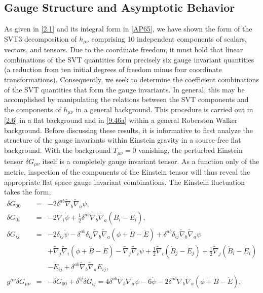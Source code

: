 \subsection{Gauge Structure and Asymptotic Behavior}
\label{ss:gauge_struct_svt3}
As given in \eqref{2.1} and its integral form in \eqref{AP65}, we have shown the form of the SVT3 decomposition of $h_{\mu\nu}$ comprising 10 independent components of scalars, vectors, and tensors. Due to the coordinate freedom, it must hold that linear combinations of the SVT quantities form precisely six gauge invariant quantities (a reduction from ten initial degrees of freedom minus four coordinate transformations). Consequently, we seek to determine the coefficient combinations of the SVT quantities that form the gauge invariants. In general, this may be accomplished by manipulating the relations between the SVT components and the components of $h_{\mu\nu}$ in a general background. This procedure is carried out in \eqref{2.6} in a flat background and in \eqref{9.46a} within a general Roberston Walker background. Before discussing these results, it is informative to first analyze the structure of the gauge invariants within Einstein gravity in a source-free flat background. With the background $T_{\mu\nu}=0$ vanishing, the perturbed Einstein tensor $\delta G_{\mu\nu}$ itself is a completely gauge invariant tensor. As a function only of the metric, inspection of the components of the Einstein tensor will thus reveal the appropriate flat space gauge invariant combinations. The Einstein fluctuation takes the form,
%
\begin{eqnarray}
\delta G_{00}&=&- 2 \delta^{ab} \tilde{\nabla}_{b}\tilde{\nabla}_{a}\psi,
\nonumber\\
\delta G_{0i}&=&- 2 \tilde{\nabla}_{i}\dot{\psi}+ \tfrac{1}{2} \delta^{ab} \tilde{\nabla}_{b}\tilde{\nabla}_{a}(B_{i} -  \dot{E}_{i}),
\nonumber\\
\delta G_{ij}&=&- 2 \delta_{ij} \ddot{\psi} -  \delta^{ab} \delta_{ij} \tilde{\nabla}_{b}\tilde{\nabla}_{a}(\phi+\dot{B}  -\ddot{E})+ \delta^{ab} \delta_{ij} \tilde{\nabla}_{b}\tilde{\nabla}_{a}\psi 
	\nonumber\\
&&
+ \tilde{\nabla}_{j}\tilde{\nabla}_{i}(\phi+\dot{B} -  \ddot{E})
-  \tilde{\nabla}_{j}\tilde{\nabla}_{i}\psi
+ \tfrac{1}{2} \tilde{\nabla}_{i}(\dot{B}_{j} - \ddot{E}_{j}) + \tfrac{1}{2} \tilde{\nabla}_{j}(\dot{B}_{i}  
- \ddot{E}_{i})
\nonumber\\
&&- \ddot{E}_{ij} + \delta^{ab} \tilde{\nabla}_{b}\tilde{\nabla}_{a}E_{ij},
\nonumber\\
g^{\mu\nu}\delta G_{\mu\nu}&=&-\delta G_{00}+\delta^{ij}\delta G_{ij}=4 \delta^{ab} \tilde{\nabla}_{b}\tilde{\nabla}_{a}\psi -6\ddot{\psi}-2 \delta^{ab} \tilde{\nabla}_{b}\tilde{\nabla}_{a}(\phi+\dot{B}  -\ddot{E}),
\nonumber\\
\label{2.3}
\end{eqnarray}
